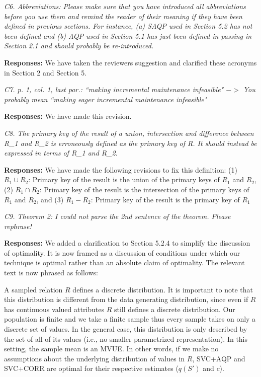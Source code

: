 \vspace{1em}
\emph{C6. Abbreviations: Please make sure that you have introduced all abbreviations before you use them and remind the reader of their meaning if they have been defined in previous sections. For instance, (a) SAQP used in Section 5.2 has not been defined and (b) AQP used in Section 5.1 has just been defined in passing in Section 2.1 and should probably be re-introduced.}

\vspace{.25em}

{\bf Responses:} We have taken the reviewers suggestion and clarified these acronyms in Section 2 and Section 5.

\vspace{1em}
\emph{C7. p. 1, col. 1, last par.: ``making incremental maintenance infeasible" $->$ You probably mean ``making eager incremental maintenance infeasible"}

\vspace{.25em}

{\bf Responses:} We have made this revision.

\vspace{1em}
\emph{C8. The primary key of the result of a union, intersection and difference between R\_1 and R\_2 is erroneously defined as the primary key of R. It should instead be expressed in terms of R\_1 and R\_2.}

\vspace{.25em}

{\bf Responses:} We have made the following revisions to fix this definition:
(1) $R_1 \cup R_2$: Primary key of the result is the union of the primary keys of $R_1$ and $R_2$, (2) $R_1 \cap R_2$: Primary key of the result is the intersection of the primary keys of $R_1$ and $R_2$, and (3) $R_1 - R_2$: Primary key of the result is the primary key of $R_1$


\vspace{1em}
\emph{C9. Theorem 2: I could not parse the 2nd sentence of the theorem. Please rephrase!}

\vspace{.25em}

{\bf Responses:} We added a clarification to Section 5.2.4 to simplify the discussion of optimality. It is now framed as a discussion of conditions under which our technique is optimal rather than an absolute claim of optimality. The relevant text is now phrased as follows:
\begin{displayquote}
A sampled relation $R$ defines a discrete distribution. It is important to note that this distribution is different from the data generating distribution, since even if $R$ has continuous valued attributes $R$ still defines a discrete distribution. Our population is finite and we take a finite sample thus every sample takes on only a discrete set of values. In the general case, this distribution is only described by the set of all of its values (i.e., no smaller parametrized representation). In this setting, the sample mean is an MVUE. In other words, if we make no assumptions about the underlying distribution of values in $R$, SVC+AQP and SVC+CORR are optimal for their respective estimates ($q(S')$ and $c$).
\end{displayquote}


